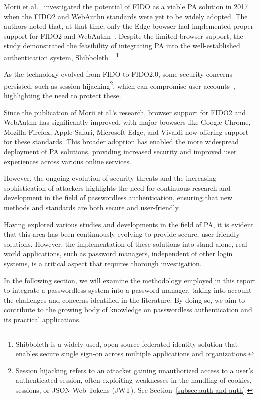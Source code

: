 Morii et al.~\cite{morii2017research} investigated the potential of FIDO as a
viable PA solution in 2017 when the FIDO2 and WebAuthn standards were yet to be
widely adopted.
The authors noted that, at that time, only the Edge browser had implemented
proper support for FIDO2 and WebAuthn~\cite{morii2017research}.
Despite the limited browser support, the study demonstrated the feasibility
of integrating PA into the well-established authentication system, Shibboleth
~\cite{shibboleth, morii2017research}.\footnote{
  Shibboleth is a widely-used, open-source federated identity solution that
  enables secure single sign-on across multiple applications and organizations.
}

As the technology evolved from FIDO to FIDO2.0, some security concerns
persisted, such as session hijacking\footnote{
  Session hijacking refers to an attacker gaining unauthorized access to a
  user's authenticated session, often exploiting weaknesses in the handling of
  cookies, sessions, or JSON Web Tokens (JWT).
  See Section~\ref{subsec:auth-and-auth}.
}, which can compromise
user accounts~\cite{morii2017research}, highlighting the need to protect these.

Since the publication of Morii et al.'s research, browser support for FIDO2 and
WebAuthn has significantly improved, with major browsers like Google Chrome,
Mozilla Firefox, Apple Safari, Microsoft Edge, and Vivaldi now offering
support for these standards.
This broader adoption has enabled the more widespread deployment of PA
solutions, providing increased security and improved user experiences across
various online services.

However, the ongoing evolution of security threats and the increasing
sophistication of attackers highlights the need for continuous research and
development in the field of passwordless authentication, ensuring that new
methods and standards are both secure and user-friendly.

Having explored various studies and developments in the field of PA, it is
evident that this area has been continuously evolving to provide secure,
user-friendly solutions.
However, the implementation of these solutions into stand-alone, real-world
applications, such as password managers, independent of other login systems, is
a critical aspect that requires thorough investigation.

In the following section, we will examine the methodology employed in this
report to integrate a passwordless system into a password manager,
taking into account the challenges and concerns identified in the literature.
By doing so, we aim to contribute to the growing body of knowledge on
passwordless authentication and its practical applications.


